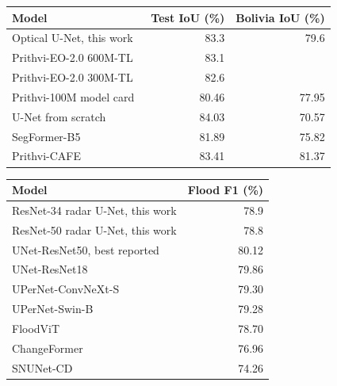 \documentclass[10pt,twocolumn,letterpaper]{article}
\newcommand{\dash}{\textemdash}
\begin{document}
\par\noindent\begin{minipage}{\linewidth}
\label{tab:published-optical}
\fontsize{8.2}{9.6}\selectfont
\begin{tabularx}{\linewidth}{@{}Lrr@{}}
\toprule
Model & Test IoU (\%) & Bolivia IoU (\%) \\
\midrule
Optical U-Net, this work & 83.3 & 79.6 \\
Prithvi-EO-2.0 600M-TL~\cite{prithvi2} & 83.1 & \dash \\
Prithvi-EO-2.0 300M-TL~\cite{prithvi2} & 82.6 & \dash \\
Prithvi-100M model card~\cite{prithvi1} & 80.46 & 77.95 \\
U-Net from scratch~\cite{li} & 84.03 & 70.57 \\
SegFormer-B5~\cite{li} & 81.89 & 75.82 \\
Prithvi-CAFE~\cite{cafe} & 83.41 & 81.37 \\
\bottomrule
\end{tabularx}
\end{minipage}\par\vspace{8pt}

\par\noindent\begin{minipage}{\linewidth}
\label{tab:published-radar}
\fontsize{8.2}{9.6}\selectfont
\begin{tabularx}{\linewidth}{@{}Lr@{}}
\toprule
Model & Flood F1 (\%) \\
\midrule
ResNet-34 radar U-Net, this work & 78.9 \\
ResNet-50 radar U-Net, this work & 78.8 \\
UNet-ResNet50, best reported & 80.12 \\
UNet-ResNet18 & 79.86 \\
UPerNet-ConvNeXt-S & 79.30 \\
UPerNet-Swin-B & 79.28 \\
FloodViT & 78.70 \\
ChangeFormer & 76.96 \\
SNUNet-CD & 74.26 \\
\bottomrule
\end{tabularx}
\end{minipage}\par\vspace{8pt}
\end{document}
